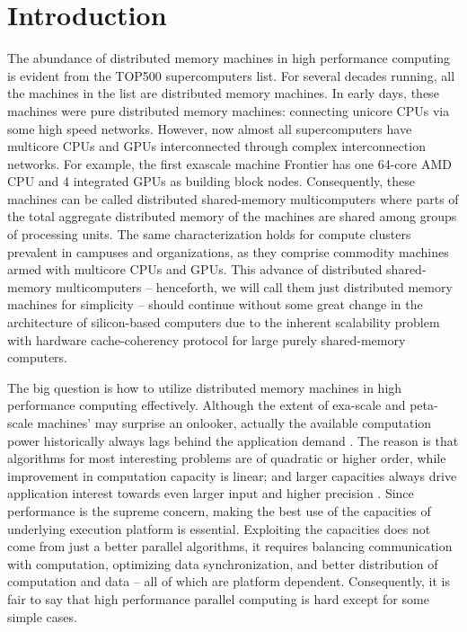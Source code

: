 \documentclass[ASNA,twocolumn]{USG} %
\begin{document}

\maketitle


\section{Introduction}
\label{sec:introduction}
The abundance of distributed memory machines in high performance computing is evident from the TOP500 \citep{Dongarra2011} supercomputers list. For several decades running, all the machines in the list are distributed memory machines. In early days, these machines were pure distributed memory machines: connecting unicore CPUs via some high speed networks. However, now almost all supercomputers have multicore CPUs and GPUs interconnected through complex interconnection networks. For example, the first exascale machine Frontier \citep{10485138} has one 64-core AMD CPU and 4 integrated GPUs as building block nodes. Consequently, these machines can be called distributed shared-memory multicomputers where parts of the total aggregate distributed memory of the machines are shared among groups of processing units. The same characterization holds for compute clusters prevalent in campuses and organizations, as they comprise commodity machines armed with multicore CPUs and GPUs. This {\color{red}advance} of distributed shared-memory multicomputers -- henceforth, we will call them just distributed memory machines for simplicity -- should continue without some {\color{red} great change} in the architecture of silicon-based computers due to the inherent scalability problem with hardware cache-coherency protocol \citep{10.1145/158439.158907} for large purely shared-memory computers.

The big question is how to utilize distributed memory machines in high performance computing effectively. Although the extent of exa-scale and peta-scale machines' may {\color{red}surprise} an onlooker, actually the available computation power historically always lags behind {\color{red} the} application demand \citep{Snyder:1986:TAS:17814.17826}. The reason is that algorithms for most interesting problems are of quadratic or higher order, while improvement in computation capacity is linear; and larger capacities always drive application interest towards even larger input and higher precision \citep{10.1145/42411.42415}. Since performance is the supreme concern, making the best use of the capacities of underlying execution platform is essential. Exploiting the capacities does not come from just a better parallel algorithms, it requires balancing communication with computation, optimizing data synchronization, and better distribution of computation and data \citep{Foster:1995:DBP:527029} -- all of which are platform dependent. Consequently, it is fair to say that high performance parallel computing is hard except for some simple cases. 
\end{document}
